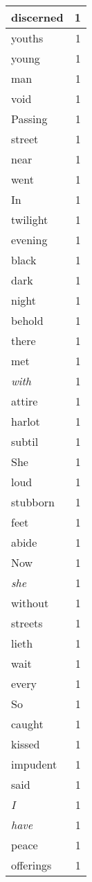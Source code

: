 \begin{center}
\begin{longtable}{l|r}
discerned & 1\\ \hline 
youths & 1\\ \hline 
young & 1\\ \hline 
man & 1\\ \hline 
void & 1\\ \hline 
Passing & 1\\ \hline 
street & 1\\ \hline 
near & 1\\ \hline 
went & 1\\ \hline 
In & 1\\ \hline 
twilight & 1\\ \hline 
evening & 1\\ \hline 
black & 1\\ \hline 
dark & 1\\ \hline 
night & 1\\ \hline 
behold & 1\\ \hline 
there & 1\\ \hline 
met & 1\\ \hline 
\emph{with} & 1\\ \hline 
attire & 1\\ \hline 
harlot & 1\\ \hline 
subtil & 1\\ \hline 
She & 1\\ \hline 
loud & 1\\ \hline 
stubborn & 1\\ \hline 
feet & 1\\ \hline 
abide & 1\\ \hline 
Now & 1\\ \hline 
\emph{she} & 1\\ \hline 
without & 1\\ \hline 
streets & 1\\ \hline 
lieth & 1\\ \hline 
wait & 1\\ \hline 
every & 1\\ \hline 
So & 1\\ \hline 
caught & 1\\ \hline 
kissed & 1\\ \hline 
impudent & 1\\ \hline 
said & 1\\ \hline 
\emph{I} & 1\\ \hline 
\emph{have} & 1\\ \hline 
peace & 1\\ \hline 
offerings & 1\\ \hline 

\end{longtable}
\end{center}
